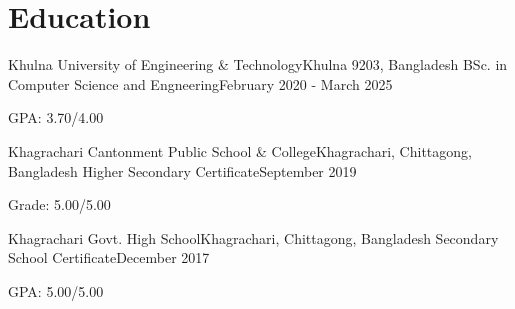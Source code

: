 \section{\textbf{Education}}
\vspace{-0.4mm}
\resumeSubHeadingListStart

\resumeSubheading
{Khulna University of Engineering \& Technology}{Khulna 9203, Bangladesh}
{BSc. in Computer Science and Engneering}{February 2020 - March 2025}
\resumeItemListStart
\item GPA: 3.70/4.00
\resumeItemListEnd

\resumeSubheading
{Khagrachari Cantonment Public School \& College}{Khagrachari, Chittagong, Bangladesh}
{Higher Secondary Certificate}{September 2019}
\resumeItemListStart
\item Grade: 5.00/5.00
\resumeItemListEnd

\resumeSubheading
{Khagrachari Govt. High School}{Khagrachari, Chittagong, Bangladesh}
{Secondary School Certificate}{December 2017}
\resumeItemListStart
\item GPA: 5.00/5.00
\resumeItemListEnd

\resumeSubHeadingListEnd
\vspace{-5mm}